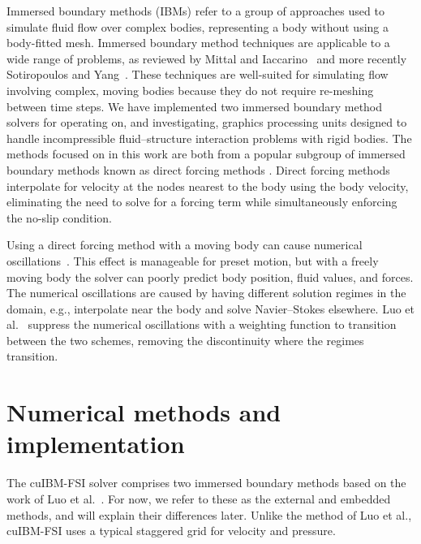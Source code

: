 \documentclass[preprint,12pt]{elsarticle}
\begin{document}
Immersed boundary methods (IBMs) refer to a group of approaches used to simulate fluid flow over complex bodies, representing a body without using a body-fitted mesh.
Immersed boundary method techniques are applicable to a wide range of problems, as reviewed by Mittal and Iaccarino~\cite{Mittal:2005ii} and more recently Sotiropoulos and Yang~\cite{Sotiropoulos:2014gv}.
These techniques are well-suited for simulating flow involving complex, moving bodies because they do not require re-meshing between time steps.
We have implemented two immersed boundary method solvers for operating on, and investigating, graphics processing units designed to handle incompressible fluid--structure interaction problems with rigid bodies.
The methods focused on in this work are both from a popular subgroup of immersed boundary methods known as direct forcing methods \cite{MohdYusof:1997wh, Fadlun:2000fl}.
Direct forcing methods interpolate for velocity at the nodes nearest to the body using the body velocity, eliminating the need to solve for a forcing term while simultaneously enforcing the no-slip condition.

Using a direct forcing method with a moving body can cause numerical oscillations~\cite{Sotiropoulos:2014gv,liao2010simulating,Luo:2012gx}.
This effect is manageable for preset motion, but with a freely moving body the solver can poorly predict body position, fluid values, and forces.
The numerical oscillations are caused by having different solution regimes in the domain, e.g., interpolate near the body and solve Navier--Stokes elsewhere.
Luo et al.~\cite{Luo:2012gx} suppress the numerical oscillations with a weighting function to transition between the two schemes, removing the discontinuity where the regimes transition.

\section{Numerical methods and implementation}
\label{sec:methods}
%
The cuIBM-FSI solver comprises two immersed boundary methods based on the work of Luo et al.~\cite{Luo:2012gx}.
For now, we refer to these as the external and embedded methods, and will explain their differences later.
Unlike the method of Luo et al., cuIBM-FSI uses a typical staggered grid for velocity and pressure.
\end{document}
